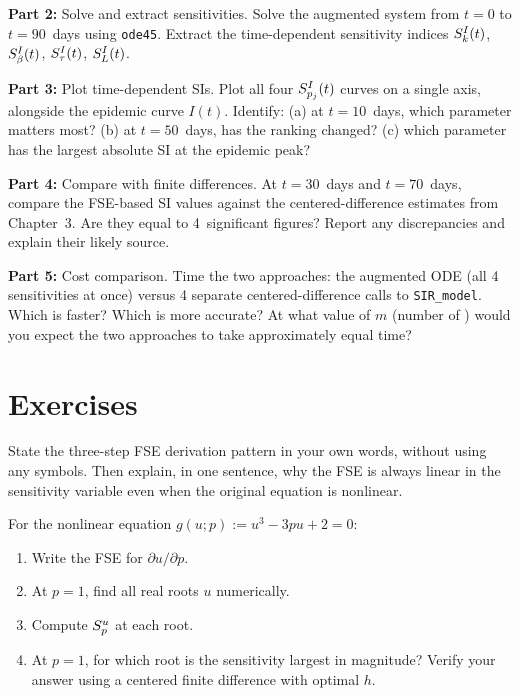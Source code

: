 \textbf{Part 2:} Solve and extract sensitivities.
Solve the augmented system from $t = 0$ to $t = 90$~days
using \texttt{ode45}. Extract the time-dependent sensitivity indices
$S_{k}^{I}(t)$, $S_{\beta}^{I}(t)$, $S_{\tau}^{I}(t)$, $S_{L}^{I}(t)$.

\textbf{Part 3:} Plot time-dependent SIs.
Plot all four $S_{p_j}^{I}(t)$ curves on a single axis, alongside the
epidemic curve $I(t)$. Identify:
(a) at $t = 10$~days, which parameter matters most?
(b) at $t = 50$~days, has the ranking changed?
(c) which parameter has the largest absolute SI at the epidemic peak?

\textbf{Part 4:} Compare with finite differences.
At $t = 30$~days and $t = 70$~days, compare the FSE-based SI values
against the centered-difference estimates from Chapter~3.
Are they equal to 4~significant figures? Report any discrepancies
and explain their likely source.

\textbf{Part 5:} Cost comparison.
Time the two approaches: the augmented ODE (all 4 sensitivities at once)
versus 4 separate centered-difference calls to \texttt{SIR\_model}.
Which is faster? Which is more accurate? At what value of $m$
(number of \POIs) would you expect the two approaches to take
approximately equal time?

\section{Exercises}
\label{sec:ch4exercises}

\begin{exercise}[\bloom{L2}]
\label{ex:ch4:pattern}
State the three-step FSE derivation pattern in your own words,
without using any symbols. Then explain, in one sentence, why
the FSE is always linear in the sensitivity variable even when
the original equation is nonlinear.
\end{exercise}

\begin{exercise}[\bloom{L3}]
\label{ex:ch4:implicit}
For the nonlinear equation $g(u; p) := u^3 - 3pu + 2 = 0$:
\begin{enumerate}[label=(\alph*)]
  \item Write the FSE for $\partial u/\partial p$.
  \item At $p = 1$, find all real roots $u$ numerically.
  \item Compute $S_{p}^{u}$ at each root.
  \item At $p = 1$, for which root is the sensitivity largest in magnitude?
        Verify your answer using a centered finite difference with optimal $h$.
\end{enumerate}
\end{exercise}

